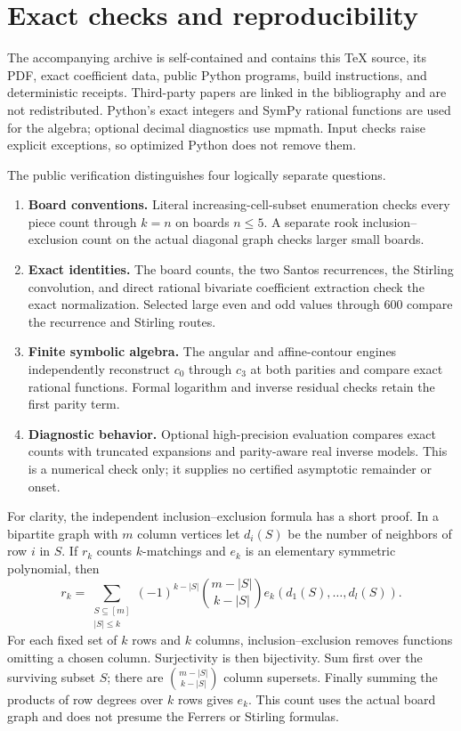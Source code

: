 \documentclass[11pt,letterpaper]{article}
\theoremstyle{remark}\newtheorem{remark}[theorem]{Remark}
\begin{document}
\section{Exact checks and reproducibility}\label{bsh:sec:checks}
The accompanying archive is self-contained and contains this TeX source, its PDF, exact coefficient data, public Python programs, build instructions, and deterministic receipts. Third-party papers are linked in the bibliography and are not redistributed. Python's exact integers and SymPy rational functions are used for the algebra; optional decimal diagnostics use mpmath. Input checks raise explicit exceptions, so optimized Python does not remove them.

The public verification distinguishes four logically separate questions.
\begin{enumerate}
\item \textbf{Board conventions.} Literal increasing-cell-subset enumeration checks every piece count through $k=n$ on boards $n\leq5$. A separate rook inclusion--exclusion count on the actual diagonal graph checks larger small boards.
\item \textbf{Exact identities.} The board counts, the two Santos recurrences, the Stirling convolution, and direct rational bivariate coefficient extraction check the exact normalization. Selected large even and odd values through $600$ compare the recurrence and Stirling routes.
\item \textbf{Finite symbolic algebra.} The angular and affine-contour engines independently reconstruct $c_0$ through $c_3$ at both parities and compare exact rational functions. Formal logarithm and inverse residual checks retain the first parity term.
\item \textbf{Diagnostic behavior.} Optional high-precision evaluation compares exact counts with truncated expansions and parity-aware real inverse models. This is a numerical check only; it supplies no certified asymptotic remainder or onset.
\end{enumerate}

For clarity, the independent inclusion--exclusion formula has a short proof. In a bipartite graph with $m$ column vertices let $d_i(S)$ be the number of neighbors of row $i$ in $S$. If $r_k$ counts $k$-matchings and $e_k$ is an elementary symmetric polynomial, then
\begin{equation}\label{bsh:eq:IE}
 r_k=\sum_{\substack{S\subseteq[m]\\|S|\leq k}}
       (-1)^{k-|S|}\binom{m-|S|}{k-|S|}
       e_k(d_1(S),\ldots,d_l(S)).
\end{equation}
For each fixed set of $k$ rows and $k$ columns, inclusion--exclusion removes functions omitting a chosen column. Surjectivity is then bijectivity. Sum first over the surviving subset $S$; there are $\binom{m-|S|}{k-|S|}$ column supersets. Finally summing the products of row degrees over $k$ rows gives $e_k$. This count uses the actual board graph and does not presume the Ferrers or Stirling formulas.
\end{document}
